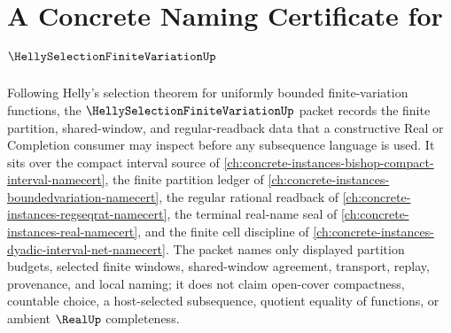\chapter{A Concrete Naming Certificate for $\HellySelectionFiniteVariationUp$}
\label{ch:concrete-instances-helly-selection-finite-variation-namecert}

Following Helly's selection theorem for uniformly bounded finite-variation functions, the $\HellySelectionFiniteVariationUp$ packet records the finite partition, shared-window, and regular-readback data that a constructive Real or Completion consumer may inspect before any subsequence language is used. It sits over the compact interval source of \autoref{ch:concrete-instances-bishop-compact-interval-namecert}, the finite partition ledger of \autoref{ch:concrete-instances-boundedvariation-namecert}, the regular rational readback of \autoref{ch:concrete-instances-regseqrat-namecert}, the terminal real-name seal of \autoref{ch:concrete-instances-real-namecert}, and the finite cell discipline of \autoref{ch:concrete-instances-dyadic-interval-net-namecert}. The packet names only displayed partition budgets, selected finite windows, shared-window agreement, transport, replay, provenance, and local naming; it does not claim open-cover compactness, countable choice, a host-selected subsequence, quotient equality of functions, or ambient $\RealUp$ completeness.

